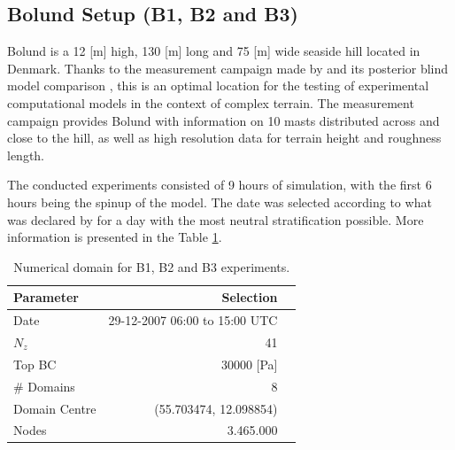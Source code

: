 \subsection{Bolund Setup (B1, B2 and B3)}
Bolund is a 12 [m] high, 130 [m] long and 75 [m] wide seaside hill located in Denmark. Thanks to the measurement campaign made by \cite{Bechmann2009}  and its posterior blind model comparison \citep{Berg2011,Bechmann2011}, this is an optimal location for the testing of experimental computational models in the context of complex terrain. The measurement campaign provides Bolund with information on 10 masts distributed across and close to the hill, as well as high resolution data for terrain height and roughness length.


The conducted experiments consisted of 9 hours of simulation, with the first 6 hours being the spinup of the model. The date was selected according to what was declared by  \cite{Bechmann2009} for a day with the most neutral stratification possible. More information is presented in the Table \ref{tab:05_config_bol}.

\begin{table}[h!]
	\caption{Numerical domain for B1, B2 and B3 experiments.}\label{tab:05_config_bol}
	\centering
	\begin{tabular}{lrr}
		\toprule
		Parameter & Selection \\
		\midrule
		Date	 	 & 29-12-2007 06:00 to 15:00 UTC \\
		$N_z$	 	 & 41   \\
		Top BC	& 30000 [Pa]\\
		\# Domains	& 8   \\
		Domain Centre	& (55.703474, 12.098854)   \\
		Nodes & 3.465.000\\
		\bottomrule
	\end{tabular}
\end{table}

